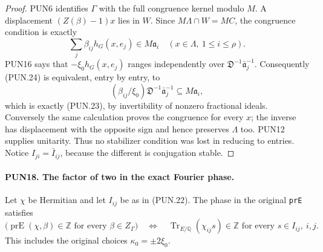 \documentclass[11pt,a4paper]{article}
\numberwithin{equation}{section}
\theoremstyle{remark}\newtheorem{remark}[theorem]{Remark}
\begin{document}
\begin{proof}
PUN6 identifies \(\Gamma\) with the full congruence kernel
modulo \(M\).  A displacement \((Z(\beta)-1)x\) lies in
\(W\).  Since \(M\Lambda\cap W=MC\), the congruence
condition is exactly
\[
  \sum_j\beta_{ij}h_G(x,e_j)\in M\mathfrak a_i
                      \quad(x\in\Lambda,\ 1\le i\le\rho).
 \tag{PUN.24}
\]
PUN16 says that \(-\xi_0h_G(x,e_j)\) ranges independently
over \(\mathfrak D^{-1}\bar{\mathfrak a}_j^{-1}\).
Consequently (PUN.24) is equivalent, entry by entry, to
\[
 (\beta_{ij}/\xi_0)
        \mathfrak D^{-1}\bar{\mathfrak a}_j^{-1}
                                      \subseteq M\mathfrak a_i,
\]
which is exactly (PUN.23), by invertibility of nonzero fractional
ideals.  Conversely the same calculation proves the congruence
for every \(x\); the inverse has displacement with the opposite
sign and hence preserves \(\Lambda\) too.  PUN12 supplies
unitarity.  Thus no stabilizer condition was lost in reducing
to entries.  Notice \(I_{ji}=\bar I_{ij}\), because the
different is conjugation stable.
\end{proof}

\paragraph{PUN18. The factor of two in the exact Fourier phase.}
\label{claim:PUN18}
Let \(\chi\) be Hermitian and let \(I_{ij}\) be as in
(PUN.22).  The phase in the original \texttt{pr\allowbreak E} satisfies
\[
 \bigl(\operatorname{prE}(\chi,\beta)\in\mathbb Z
                 \text{ for every }\beta\in Z_\Gamma\bigr)
 \quad\Longleftrightarrow\quad
 \operatorname{Tr}_{E/\mathbb Q}(\chi_{ij}s)\in\mathbb Z
                 \text{ for every }s\in I_{ij},\ i,j.
 \tag{PUN.25}
\]
This includes the original choices \(\kappa_0=\pm2\xi_0\).
\end{document}
